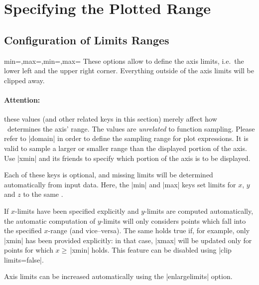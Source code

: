 
\section{Specifying the Plotted Range}

\subsection{Configuration of Limits Ranges}

\begin{pgfplotsxykeylist}{\x min=,\x max=,min=,max=}
These options allow to define the axis limits, i.e.\ the lower left and the upper right corner. Everything outside of the axis limits will be clipped away.

\paragraph{Attention:} these values (and other related keys in this section) merely affect how \PGFPlots\ determines the axis' range. The values are \emph{unrelated} to function sampling. Please refer to |domain| in order to define the sampling range for plot expressions. It is valid to sample a larger or smaller range than the displayed portion of the axis. Use |xmin| and its friends to specify which portion of the axis is to be displayed.

Each of these keys is optional, and missing limits will be determined automatically from input data. Here, the |min| and |max| keys set limits for $x$, $y$ and $z$ to the same .

If $x$-limits have been specified explicitly and $y$-limits are computed automatically, the automatic computation of $y$-limits will only considers points which fall into the specified $x$-range (and vice--versa). The same holds true if, for example, only |xmin| has been provided explicitly: in that case, |xmax| will be updated only for points for which $x \ge \,$|xmin| holds. This feature can be disabled using |clip limits=false|.

Axis limits can be increased automatically using the |enlargelimits| option.
\begin{codeexample}[]
\end{codeexample}


\end{pgfplotsxykeylist}
